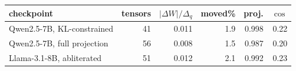 \setlength{\tabcolsep}{3.5pt}
\begin{tabular}{@{}l r r r r r@{}}
\toprule
checkpoint & tensors & $|\Delta W|/\Delta_q$ & moved\% & proj. & $\cos$ \\
\midrule
Qwen2.5-7B, KL-constrained & 41 & 0.011 & 1.9 & 0.998 & 0.22 \\
Qwen2.5-7B, full projection & 56 & 0.008 & 1.5 & 0.987 & 0.20 \\
Llama-3.1-8B, abliterated & 51 & 0.012 & 2.1 & 0.992 & 0.23 \\
\bottomrule
\end{tabular}
